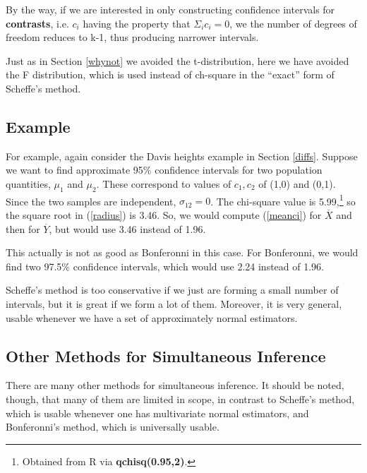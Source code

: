 By the way, if we are interested in only constructing confidence
intervals for {\bf contrasts}, i.e. $c_i$ having the property that
$\Sigma_i c_i = 0$, we the number of degrees of freedom reduces to k-1,
thus producing narrower intervals.

Just as in Section \ref{whynot} we avoided the t-distribution, here we
have avoided the F distribution, which is used instead of ch-square in
the ``exact'' form of Scheffe's method.

\subsection{Example}

For example, again consider the Davis heights example in Section
\ref{diffs}.  Suppose we want to find approximate 95\% confidence
intervals for two population quantities, $\mu_1$ and $\mu_2$.  These
correspond to values of $c_1,c_2$ of (1,0) and (0,1).  Since the two
samples are independent, $\sigma_{12} = 0$.  The chi-square value is
5.99,\footnote{Obtained from R via {\bf qchisq(0.95,2)}.} so the square
root in (\ref{radius}) is 3.46.  So, we would compute (\ref{meanci}) for
$\overline{X}$ and then for $\overline{Y}$, but would use 3.46 instead of 1.96.

This actually is not as good as Bonferonni in this case.  For
Bonferonni, we would find two 97.5\% confidence intervals, which would
use 2.24 instead of 1.96.


Scheffe's method is too conservative if we just are forming a small
number of intervals, but it is great if we form a lot of them.
Moreover, it is very general, usable whenever we have a set of
approximately normal estimators.

\subsection{Other Methods for Simultaneous Inference}

There are many other methods for simultaneous inference.  It should be
noted, though, that many of them are limited in scope, in contrast to
Scheffe's method, which is usable whenever one has multivariate normal
estimators, and Bonferonni's method, which is universally usable.

